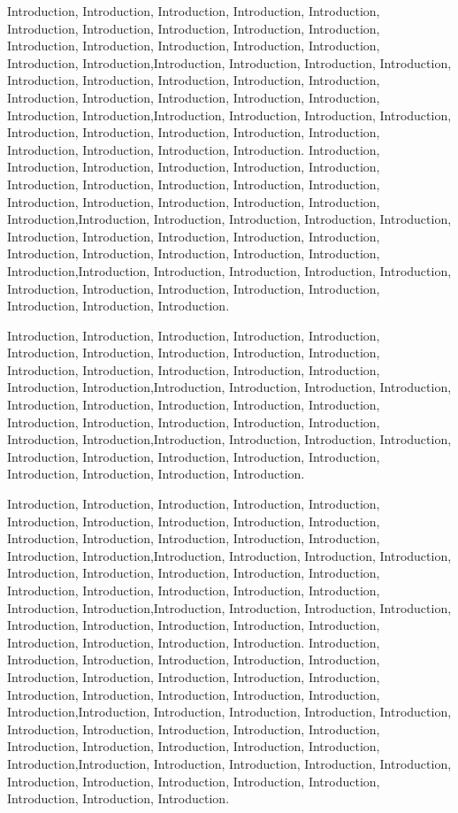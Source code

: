 Introduction, Introduction, Introduction, Introduction, Introduction, Introduction, Introduction, Introduction, Introduction, Introduction, Introduction, Introduction, Introduction, Introduction, Introduction, Introduction, Introduction,Introduction, Introduction, Introduction, Introduction, Introduction, Introduction, Introduction, Introduction, Introduction, Introduction, Introduction, Introduction, Introduction, Introduction, Introduction, Introduction,Introduction, Introduction, Introduction, Introduction, Introduction, Introduction, Introduction, Introduction, Introduction, Introduction, Introduction, Introduction, Introduction.
Introduction, Introduction, Introduction, Introduction, Introduction, Introduction, Introduction, Introduction, Introduction, Introduction, Introduction, Introduction, Introduction, Introduction, Introduction, Introduction, Introduction,Introduction, Introduction, Introduction, Introduction, Introduction, Introduction, Introduction, Introduction, Introduction, Introduction, Introduction, Introduction, Introduction, Introduction, Introduction, Introduction,Introduction, Introduction, Introduction, Introduction, Introduction, Introduction, Introduction, Introduction, Introduction, Introduction, Introduction, Introduction, Introduction.

Introduction, Introduction, Introduction, Introduction, Introduction, Introduction, Introduction, Introduction, Introduction, Introduction, Introduction, Introduction, Introduction, Introduction, Introduction, Introduction, Introduction,Introduction, Introduction, Introduction, Introduction, Introduction, Introduction, Introduction, Introduction, Introduction, Introduction, Introduction, Introduction, Introduction, Introduction, Introduction, Introduction,Introduction, Introduction, Introduction, Introduction, Introduction, Introduction, Introduction, Introduction, Introduction, Introduction, Introduction, Introduction, Introduction.

Introduction, Introduction, Introduction, Introduction, Introduction, Introduction, Introduction, Introduction, Introduction, Introduction, Introduction, Introduction, Introduction, Introduction, Introduction, Introduction, Introduction,Introduction, Introduction, Introduction, Introduction, Introduction, Introduction, Introduction, Introduction, Introduction, Introduction, Introduction, Introduction, Introduction, Introduction, Introduction, Introduction,Introduction, Introduction, Introduction, Introduction, Introduction, Introduction, Introduction, Introduction, Introduction, Introduction, Introduction, Introduction, Introduction.
Introduction, Introduction, Introduction, Introduction, Introduction, Introduction, Introduction, Introduction, Introduction, Introduction, Introduction, Introduction, Introduction, Introduction, Introduction, Introduction, Introduction,Introduction, Introduction, Introduction, Introduction, Introduction, Introduction, Introduction, Introduction, Introduction, Introduction, Introduction, Introduction, Introduction, Introduction, Introduction, Introduction,Introduction, Introduction, Introduction, Introduction, Introduction, Introduction, Introduction, Introduction, Introduction, Introduction, Introduction, Introduction, Introduction.


